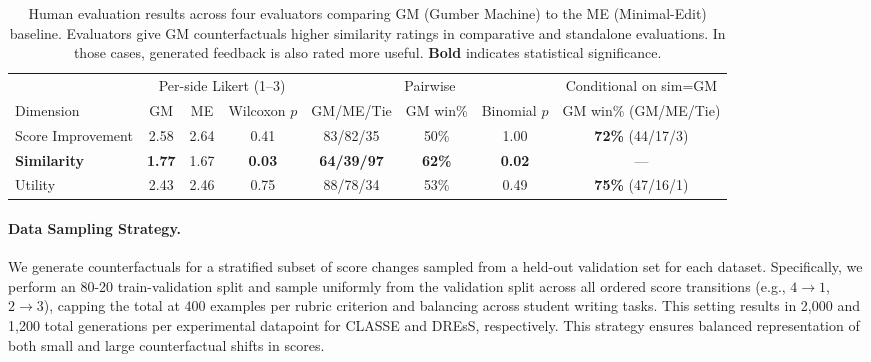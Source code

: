 \documentclass[letterpaper]{article} %
\begin{document}
\begin{table}[ht]
\centering
\small
\begin{tabular}{l c c c c c c c}
\toprule
& \multicolumn{3}{c}{Per-side Likert (1--3)} & \multicolumn{3}{c}{Pairwise} & Conditional on sim=GM \\
\cmidrule(lr){2-4} \cmidrule(lr){5-7} \cmidrule(lr){8-8}
Dimension & GM & ME & Wilcoxon $p$ & GM/ME/Tie & GM win\% & Binomial $p$ & GM win\% (GM/ME/Tie) \\
\midrule
Score Improvement       & 2.58 & 2.64 & 0.41 & 83/82/35 & 50\% & 1.00 & \textbf{72\%} (44/17/3) \\
\textbf{Similarity} & \textbf{1.77} & 1.67 & \textbf{0.03} & \textbf{64/39/97} & \textbf{62\%} & \textbf{0.02} & --- \\
Utility      & 2.43 & 2.46 & 0.75 & 88/78/34 & 53\% & 0.49 & \textbf{75\%} (47/16/1) \\
\bottomrule
\end{tabular}
\caption{Human evaluation results across four evaluators comparing GM (Gumber Machine) to the ME (Minimal-Edit) baseline. Evaluators give GM counterfactuals higher similarity ratings in comparative and standalone evaluations. In those cases, generated feedback is also rated more useful. \textbf{Bold} indicates statistical significance.}
\label{tab:human_eval}
\end{table}

\paragraph{Data Sampling Strategy.}
We generate counterfactuals for a stratified subset of score changes sampled from a held-out validation set for each dataset. Specifically, we perform an 80-20 train-validation split and sample uniformly from the validation split across all ordered score transitions (e.g., $4 \rightarrow 1$, $2 \rightarrow 3$), capping the total at 400 examples per rubric criterion and balancing across student writing tasks. This setting results in 2,000 and 1,200 total generations per experimental datapoint for CLASSE and DREsS, respectively. This strategy ensures balanced representation of both small and large counterfactual shifts in scores.

\end{document}
